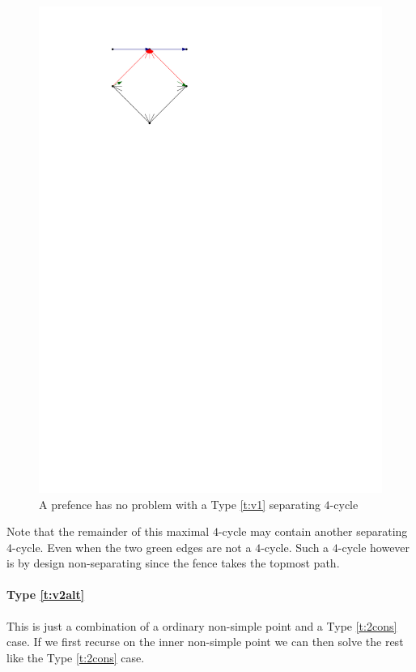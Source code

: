   \begin{figure}[h]
    \centering
    \includegraphics[scale=1]{4cycles/img/cycle_e}
    \caption{A prefence has no problem with a Type \ref{t:v1} separating $4$-cycle}
    \label{fig:4c:v1}
  \end{figure}

  Note that the remainder of this maximal $4$-cycle may contain another separating $4$-cycle. Even when the two green edges are not a $4$-cycle. Such a $4$-cycle however is by design non-separating since the fence takes the topmost path.

  \paragraph{Type \ref{t:v2alt}}
  This is just a combination of a ordinary non-simple point and a Type \ref{t:2cons} case. If we first recurse on the inner non-simple point we can then solve the rest like the Type \ref{t:2cons} case.

